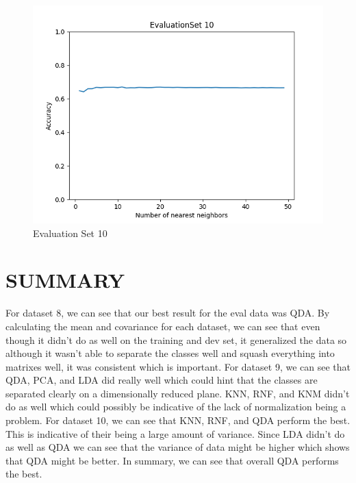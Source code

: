 \documentclass{article}
\begin{document}
\begin{figure}[H]
\begin{minipage}{.33\textwidth}
			\includegraphics[width=1\linewidth]{../KNN_EvaluationSet 10.png}
			\caption{Evaluation Set 10}
	\end{minipage}\hfill
\end{figure}

\section{\MakeUppercase{Summary}}
\begin{flushleft}For dataset 8, we can see that our best result for the eval data was QDA. By calculating the mean and covariance for each dataset, we can see that even though it didn't do as well on the training and dev set, it generalized the data so although it wasn't able to separate the classes well and squash everything into matrixes well, it was consistent which is important.\break\break
For dataset 9, we can see that QDA, PCA, and LDA did really well which could hint that the classes are separated clearly on a dimensionally reduced plane. KNN, RNF, and KNM didn't do as well which could possibly be indicative of the lack of normalization being a problem.\break\break
For dataset 10, we can see that KNN, RNF, and QDA perform the best. This is indicative of their being a large amount of variance. Since LDA didn't do as well as QDA we can see that the variance of data might be higher which shows that QDA might be better.\break\break
In summary, we can see that overall QDA performs the best.

\end{flushleft}
\end{document}
